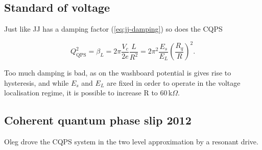 \subsection{Standard of voltage}
\label{sec:standard-voltage}

Just like JJ has a damping factor (\autoref{eq:jj-damping}) so does the CQPS

\begin{equation}
  Q_{\text{QPS}}^2 = \beta_L = 2\pi \frac{V_{c}}{2e}\frac{L}{R^{2}} = 2\pi^{2}\frac{E_{s}}{E_{L}}\left( \frac{R_{q}}{R} \right)^2.
\end{equation}

\newpage Too much damping is bad, as on the washboard potential is gives rise to
hysteresis, and  while $E_s$  and $E_L$  are fixed  in order  to operate  in the
voltage localisation regime, it is possible to increase R to 60\,k$\Omega$.

\subsection{Coherent quantum phase slip 2012 \cite{Astafiev_2012}}
\label{sec:coher-quant-phase}

Oleg drove the CQPS system in the two level approximation by a resonant drive.

